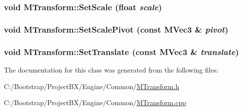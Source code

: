 \hypertarget{class_m_transform_cb73de272c406f5aede802ff4eea8e9b}{
\subsubsection[{SetScale}]{\setlength{\rightskip}{0pt plus 5cm}void MTransform::SetScale (float {\em scale})}}
\label{class_m_transform_cb73de272c406f5aede802ff4eea8e9b}


\hypertarget{class_m_transform_135a0c870171bbab7fe4279da97b7ac5}{
\subsubsection[{SetScalePivot}]{\setlength{\rightskip}{0pt plus 5cm}void MTransform::SetScalePivot (const {\bf MVec3} \& {\em pivot})}}
\label{class_m_transform_135a0c870171bbab7fe4279da97b7ac5}


\hypertarget{class_m_transform_f102cc4b732847ed592765b10f779234}{
\subsubsection[{SetTranslate}]{\setlength{\rightskip}{0pt plus 5cm}void MTransform::SetTranslate (const {\bf MVec3} \& {\em translate})}}
\label{class_m_transform_f102cc4b732847ed592765b10f779234}




The documentation for this class was generated from the following files:\begin{CompactItemize}
\item 
C:/Bootstrap/ProjectBX/Engine/Common/\hyperlink{_m_transform_8h}{MTransform.h}\item 
C:/Bootstrap/ProjectBX/Engine/Common/\hyperlink{_m_transform_8cpp}{MTransform.cpp}\end{CompactItemize}
